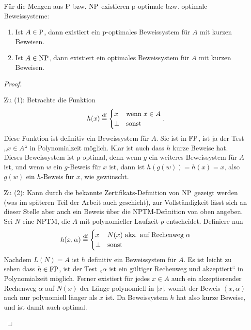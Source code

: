 Für die Mengen aus $\P$ bzw. $\NP$ existieren p-optimale bzw. optimale Beweissysteme:
\begin{observation}\label{obs:np-short-ps}
    \begin{enumerate}
        \item Ist $A\in \P$, dann existiert ein p-optimales Beweissystem für $A$ mit kurzen Beweisen.
        \item Ist $A\in \NP$, dann existiert ein optimales Beweissystem für $A$ mit kurzen Beweisen.
    \end{enumerate}
\end{observation}
\begin{proof}
\begin{prooflist}
\item Zu (1): Betrachte die Funktion
    \[ h(x) \defeq \begin{cases} x & \text{wenn $x\in A$} \\ \bot & \text{sonst} \end{cases}. \]
    Diese Funktion ist definitiv ein Beweissystem für $A$. Sie ist in $\FP$, ist ja der Test „$x\in A$“ in Polynomialzeit möglich. Klar ist auch dass $h$ kurze Beweise hat. Dieses Beweissystem ist p-optimal, denn wenn $g$ ein weiteres Beweissystem für $A$ ist, und wenn $w$ ein $g$-Beweis für $x$ ist, dann ist $h(g(w))=h(x)=x$, also $g(w)$ ein $h$-Beweis für $x$, wie gewünscht. 

\item Zu (2): Kann durch die bekannte Zertifikats-Definition von $\NP$ gezeigt werden (was im späteren Teil der Arbeit auch geschieht), zur Vollständigkeit lässt sich an dieser Stelle aber auch ein Beweis über die NPTM-Definition von oben angeben. Sei $N$ eine NPTM, die $A$ mit polynomieller Laufzeit $p$ entscheidet.
    Definiere nun
    \[ h(x, \alpha) \defeq \begin{cases} x & \text{$N(x)$ akz. auf Rechenweg $\alpha$} \\ \bot & \text{sonst} \end{cases} \]
    Nachdem $L(N)=A$ ist $h$ definitiv ein Beweissystem für $A$. Es ist leicht zu sehen dass $h\in\FP$, ist der Test „$\alpha$ ist ein gültiger Rechenweg und akzeptiert“ in Polynomialzeit möglich. Ferner existiert für jedes $x\in A$ auch ein akzeptierender Rechenweg $\alpha$ auf $N(x)$ der Länge polynomiell in $|x|$, womit der Beweis $(x, \alpha)$ auch nur polynomiell länger als $x$ ist. Da Beweissystem $h$ hat also kurze Beweise, und ist damit auch optimal.
\end{prooflist}
\end{proof}

